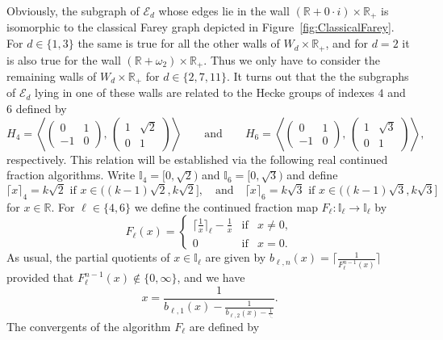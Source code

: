 \documentclass[graybox]{svmult}
\begin{document}
Obviously, the subgraph of $\mathcal E_{d}$ whose edges lie in the wall  $(\mathbb{R}+ 0\cdot i)\times \mathbb{R}_+$ is isomorphic to the classical Farey graph depicted in Figure~\ref{fig:ClassicalFarey}. For $d\in \{1,3\}$ the same is true for all the other walls of $W_d\times\mathbb{R}_+$, and for $d=2$ it is also true for the wall $(\mathbb{R}+ \omega_2)\times \mathbb{R}_+$.
Thus we only have to consider the remaining walls of $W_d\times\mathbb{R}_+$ for $d \in\{2, 7, 11\}$. It turns out that the the subgraphs of $\mathcal E_{d}$ lying in one of these walls are related to the Hecke groups of indexes $4$ and $6$ defined by 
\[ 
H_{4} =\left\langle \begin{pmatrix} 0 & 1 \\ -1 & 0 \end{pmatrix}, \, 
\begin{pmatrix} 1 & \sqrt{2} \\ 0 & 1  \end{pmatrix} \right\rangle \qquad\text{and}\qquad
H_{6} = \left\langle \begin{pmatrix} 0 & 1 \\ -1 & 0 \end{pmatrix}, \, 
\begin{pmatrix} 1 & \sqrt{3} \\ 0 & 1  \end{pmatrix} \right\rangle,
\]
respectively. This relation  will be established via the following real continued fraction algorithms.
Write $\mathbb I_{4} = [0, \sqrt{2})$ and $\mathbb I_{6} = [0, \sqrt{3})$ and define
\[
\lceil x \rceil_{4} = k \sqrt{2} \,\, \mbox{if} \,\,x \in \big( (k-1) \sqrt{2}, 
k\sqrt{2} \big] , \quad\text{and}\quad  \lceil x \rceil_{6} = k \sqrt{3} \,\, \mbox{if} \,\, x \in \big( (k-1) \sqrt{3}, k\sqrt{3} \big]
\]
for $x \in \mathbb R$.  For $\ell\in\{4,6\}$  we define the continued fraction map $F_{\ell}:\mathbb I_{\ell}\to\mathbb I_{\ell}$ by 
\[
F_{\ell}(x) = \left\{\begin{array}{lll}
\big\lceil \tfrac{1}{x} \big\rceil_{\ell} - \tfrac{1}{x} & \mbox{if} & x \ne 0, \\
0 & \mbox{if} & x = 0. \end{array}\right.
\]
As usual, the partial quotients of $x\in \mathbb I_{\ell}$ are given by $b_{\ell, n}(x) = \big\lceil \tfrac{1}{F_{\ell}^{n-1}(x)}\big\rceil$ provided that $F_{\ell}^{n-1}(x) \not\in\{0,\infty\}$, and we have 
\[
x=
\displaystyle \frac1{b_{\ell, 1}(x)- 
 \displaystyle  \frac1{b_{\ell, 2}(x) - 
 \displaystyle \frac1{\ddots}}}.
\]
The convergents of the algorithm $F_\ell$ are defined by 
\end{document}
